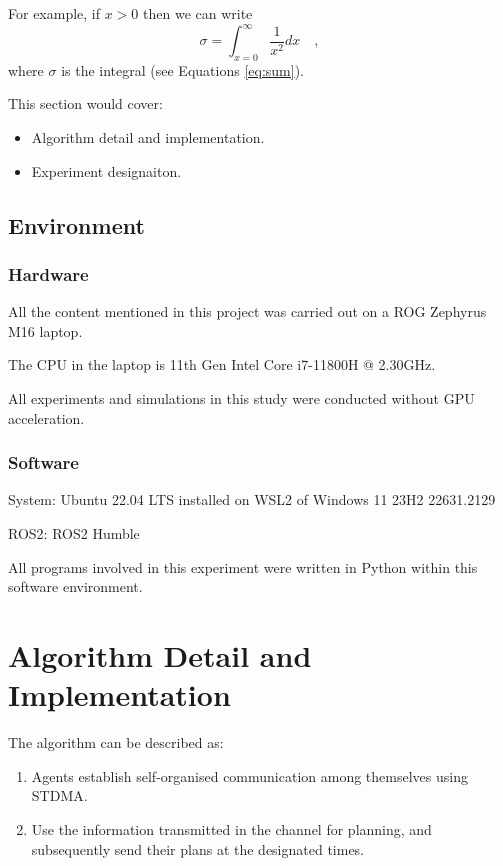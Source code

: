 {{For example, if $x>0$ then we can write
\begin{equation}
\label{eq:sum}
\sigma =\int_{x=0}^{\infty} \frac{1}{x^2}dx \quad ,
\end{equation}
where $\sigma$ is the integral (see Equations \ref{eq:sum}).  

}


This section would cover:
\begin{itemize}
    \item Algorithm detail and implementation.
    \item Experiment designaiton.
\end{itemize}

\subsection*{Environment}
\subsubsection{Hardware}

\indent All the content mentioned in this project was carried out on a ROG Zephyrus M16 laptop.

The CPU in the laptop is 11th Gen Intel Core i7-11800H @ 2.30GHz.

All experiments and simulations in this study were conducted without GPU acceleration.

\subsubsection{Software}

\indent System: Ubuntu 22.04 LTS installed on WSL2 of Windows 11 23H2 22631.2129

ROS2: ROS2 Humble

All programs involved in this experiment were written in Python within this software environment.

\section{Algorithm Detail and Implementation}

The algorithm can be described as: 
\begin{enumerate}
    \item Agents establish self-organised communication among themselves using STDMA.
    \item Use the information transmitted in the channel for planning, and subsequently send their plans at the designated times.
\end{enumerate}

}
